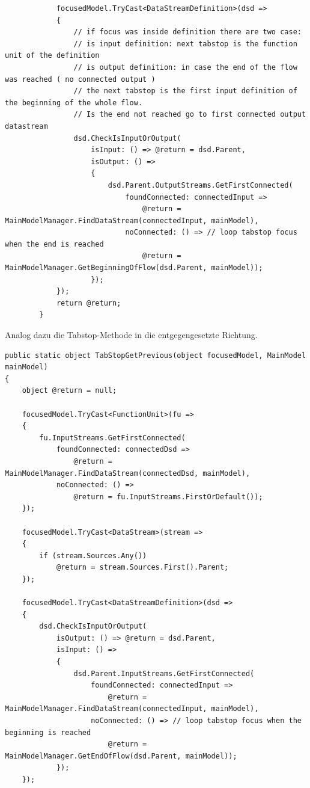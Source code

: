 \documentclass[11pt]{article}
\begin{document}
\begin{enumerate}
\begin{verbatim}
            focusedModel.TryCast<DataStreamDefinition>(dsd =>
            {
                // if focus was inside definition there are two case:
                // is input definition: next tabstop is the function unit of the definition
                // is output definition: in case the end of the flow was reached ( no connected output ) 
                // the next tabstop is the first input definition of the beginning of the whole flow.
                // Is the end not reached go to first connected output datastream
                dsd.CheckIsInputOrOutput( 
                    isInput: () => @return = dsd.Parent,
                    isOutput: () =>
                    {
                        dsd.Parent.OutputStreams.GetFirstConnected(
                            foundConnected: connectedInput => 
                                @return = MainModelManager.FindDataStream(connectedInput, mainModel),
                            noConnected: () => // loop tabstop focus when the end is reached
                                @return = MainModelManager.GetBeginningOfFlow(dsd.Parent, mainModel)); 
                    });
            });
            return @return;
        }
\end{verbatim}

Analog dazu die Tabstop-Methode in die entgegengesetzte Richtung.


\begin{verbatim}
public static object TabStopGetPrevious(object focusedModel, MainModel mainModel)
{
    object @return = null;

    focusedModel.TryCast<FunctionUnit>(fu => 
    {
        fu.InputStreams.GetFirstConnected(
            foundConnected: connectedDsd => 
                @return = MainModelManager.FindDataStream(connectedDsd, mainModel),
            noConnected: () =>
                @return = fu.InputStreams.FirstOrDefault());
    });

    focusedModel.TryCast<DataStream>(stream => 
    {
        if (stream.Sources.Any())
            @return = stream.Sources.First().Parent;
    });

    focusedModel.TryCast<DataStreamDefinition>(dsd => 
    {
        dsd.CheckIsInputOrOutput(
            isOutput: () => @return = dsd.Parent,
            isInput: () => 
            {
                dsd.Parent.InputStreams.GetFirstConnected(
                    foundConnected: connectedInput =>
                        @return = MainModelManager.FindDataStream(connectedInput, mainModel),
                    noConnected: () => // loop tabstop focus when the beginning is reached
                        @return = MainModelManager.GetEndOfFlow(dsd.Parent, mainModel));
            });
    });


\end{verbatim}
\end{enumerate}
\end{document}
